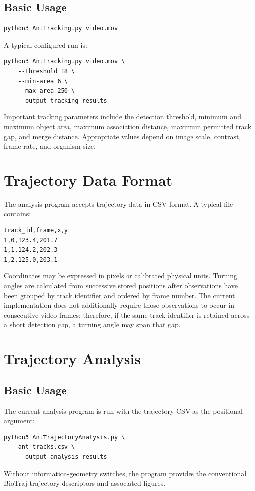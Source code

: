 \documentclass[11pt,a4paper]{article}
\begin{document}
\subsection{Basic Usage}
\begin{lstlisting}
python3 AntTracking.py video.mov
\end{lstlisting}
A typical configured run is:
\begin{lstlisting}
python3 AntTracking.py video.mov \
    --threshold 18 \
    --min-area 6 \
    --max-area 250 \
    --output tracking_results
\end{lstlisting}
Important tracking parameters include the detection threshold, minimum and maximum object area, maximum association distance, maximum permitted track gap, and merge distance. Appropriate values depend on image scale, contrast, frame rate, and organism size.

\section{Trajectory Data Format}
The analysis program accepts trajectory data in CSV format. A typical file contains:
\begin{lstlisting}
track_id,frame,x,y
1,0,123.4,201.7
1,1,124.2,202.3
1,2,125.0,203.1
\end{lstlisting}
Coordinates may be expressed in pixels or calibrated physical units. Turning angles are calculated from successive stored positions after observations have been grouped by track identifier and ordered by frame number. The current implementation does not additionally require those observations to occur in consecutive video frames; therefore, if the same track identifier is retained across a short detection gap, a turning angle may span that gap.

\section{Trajectory Analysis}
\subsection{Basic Usage}
The current analysis program is run with the trajectory CSV as the positional argument:
\begin{lstlisting}
python3 AntTrajectoryAnalysis.py \
    ant_tracks.csv \
    --output analysis_results
\end{lstlisting}
Without information-geometry switches, the program provides the conventional BioTraj trajectory descriptors and associated figures.
\end{document}
